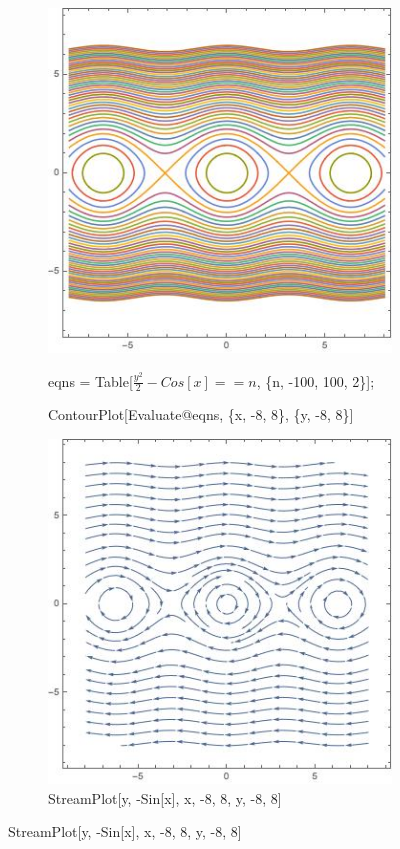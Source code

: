 \documentclass[12pt,letterpaper,reqno]{amsart}
\begin{document}
\begin{enumerate}
\begin{flushleft}
\begin{enumerate}
    \begin{figure}[h]
    \centering
    \begin{subfigure}{.5\textwidth}
      \centering
      \includegraphics[width=.8\linewidth]{./ContourPlotC.jpeg}
      \caption*{eqns = Table[$\frac{y^2}{2} - Cos[x] == n$, \{n, -100, 100, 2\}];}
      \caption*{ContourPlot[Evaluate@eqns, \{x, -8, 8\}, \{y, -8, 8\}]}
    \end{subfigure}%
    \begin{subfigure}{.5\textwidth}
      \centering
      \includegraphics[width=.8\linewidth]{./StreamPlotC.jpeg}
      \caption*{StreamPlot[{y, -Sin[x]}, {x, -8, 8}, {y, -8, 8}]}
    \end{subfigure}
    \end{figure}
    

\end{enumerate}
\end{flushleft}
\end{enumerate}
\end{document}
